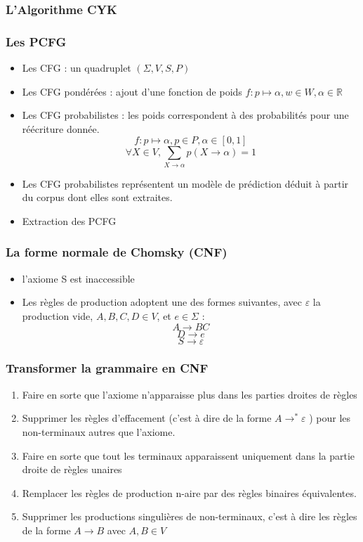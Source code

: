 \documentclass{beamer}
\begin{document}
\begin{frame}
 \frametitle{L'Algorithme CYK}

\end{frame}

\begin{frame}
 \frametitle{Les PCFG}
 \begin{itemize}
  \item<1-5>{Les CFG : un quadruplet $(\Sigma,V,S,P)$ }
  \item<2>{Les CFG pondérées : ajout d'une fonction de poids $ f : p \mapsto \alpha, w \in W, \alpha \in \mathbb{R} $ }
  \item<3-5>{Les CFG probabilistes : les poids correspondent à des probabilités pour une réécriture donnée.  
  $$ f : p \mapsto \alpha, p \in P, \alpha \in [0,1]$$ $$ \forall X \in V, \sum_{X\to\alpha}p(X\to\alpha)=1 $$ }
  \item<4-5>{Les CFG probabilistes représentent un modèle de prédiction déduit à partir du corpus dont elles sont extraites.}
  \item<5>{Extraction des PCFG}
 \end{itemize}

\end{frame}



\begin{frame} 
\frametitle{La forme normale de Chomsky (CNF)}
 \begin{itemize}
 \item {l'axiome S est inaccessible}
 \item {Les règles de production adoptent une des formes suivantes, avec  $\varepsilon$ la production vide, $A,B,C,D \in V$, et $e \in \Sigma$ : 
     $$A \rightarrow B C $$ 
     $$ D \rightarrow e $$
     $$ S \rightarrow \varepsilon$$ }

 \end{itemize}

\end{frame}

\begin{frame}
 \frametitle{Transformer la grammaire en CNF}
 \begin{enumerate}
 \item<1>{ Faire en sorte que l'axiome n'apparaisse plus dans les parties droites de règles}
 \item<1>{Supprimer les règles d'effacement (c'est à dire de la forme $A \rightarrow^*\varepsilon$ ) pour les non-terminaux autres que l'axiome.}
 \item<1>{Faire en sorte que tout les terminaux apparaissent uniquement dans la partie droite de règles unaires }
 \item<1-2>{Remplacer les règles de production n-aire par des règles binaires équivalentes.}
 \item<1-2>{Supprimer les productions singulières de non-terminaux, c'est à dire les règles de la forme $A \rightarrow B$ avec $A,B \in V$ }
 \end{enumerate}
 

 
\end{frame}
\end{document}
